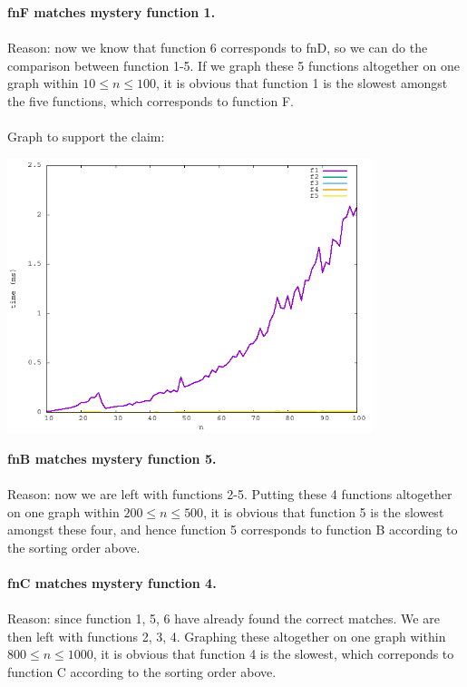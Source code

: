 \documentclass{article}
\begin{document}
\begin{itemize}
            \textbf{fnF matches mystery function 1.} \\ \\
            Reason: now we know that function 6 corresponds to fnD, so we can do the comparison between function 1-5. If we graph these 5 functions altogether on 
            one graph within $10 \leq n \leq 100$, it is obvious that function 1 is the slowest amongst the five functions, which corresponds to function F. \\ \\
            Graph to support the claim: 
            \begin{center}
                \includegraphics[width=0.8\textwidth]{f1_to_f5_10_100}
            \end{center} 
            \vspace{10cm}
            \textbf{fnB matches mystery function 5.} \\ \\
            Reason: now we are left with functions 2-5. Putting these 4 functions altogether on one graph within $200 \leq n \leq 500$, it is obvious that function 5 is the
            slowest amongst these four, and hence function 5 corresponds to function B according to the sorting order above. \\ \\
            
            \textbf{fnC matches mystery function 4.} \\ \\
            Reason: since function 1, 5, 6 have already found the correct matches. We are then left with functions 2, 3, 4. Graphing these altogether on one graph 
            within $800 \leq n \leq 1000$, it is obvious that function 4 is the slowest, which correponds to function C according to the sorting order above. \\ \\
            

\end{itemize}
\end{document}
